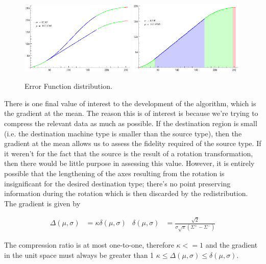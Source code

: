 \begin{figure}[h!]
  \centering
    \includegraphics[width=0.49\textwidth]{Chapter2/Figs/ERFSmooth2.eps}
    \includegraphics[width=0.49\textwidth]{Chapter2/Figs/ERFColor2.eps}
    \caption{Error Function distribution.}  \label{fig:ERF}
\end{figure}

There is one final value of interest to the development of the algorithm, which is the gradient at the mean. The reason this is of interest is because we're trying to compress the relevant data as much as possible. If the destination region is small (i.e. the destination machine type is smaller than the source type), then the gradient at the mean allows us to assess the fidelity required of the source type. If it weren't for the fact that the source is the result of a rotation transformation, then there would be little purpose in assessing this value. However, it is entirely possible that the lengthening of the axes resulting from the rotation is insignificant for the desired destination type; there's no point preserving information during the rotation which is then discarded by the redistribution. The gradient is given by

\begin{equation}\label{eq:gradient}
\begin{aligned}
\Delta(\mu,\sigma) &= \kappa  \delta(\mu,\sigma)  & \delta(\mu,\sigma)  &= \frac{ \sqrt{2} }{ \sigma \sqrt{\pi }  \left(\Sigma^+-\Sigma^-\right)}
\end{aligned}
\end{equation}

The compression ratio is at most one-to-one, therefore $\kappa <=1$ and the gradient in the unit space must always be greater than 1 $ \kappa \le \Delta(\mu,\sigma) \le \delta(\mu,\sigma)$.

